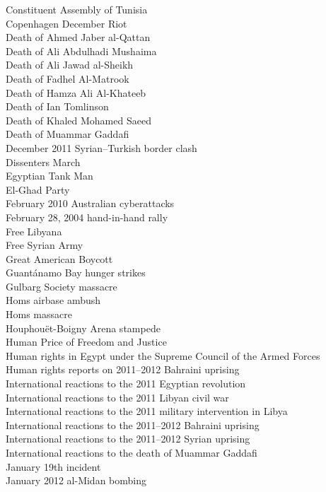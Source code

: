 Constituent Assembly of Tunisia\\
Copenhagen December Riot\\
Death of Ahmed Jaber al-Qattan\\
Death of Ali Abdulhadi Mushaima\\
Death of Ali Jawad al-Sheikh\\
Death of Fadhel Al-Matrook\\
Death of Hamza Ali Al-Khateeb\\
Death of Ian Tomlinson\\
Death of Khaled Mohamed Saeed\\
Death of Muammar Gaddafi\\
December 2011 Syrian–Turkish border clash\\
Dissenters March\\
Egyptian Tank Man\\
El-Ghad Party\\
February 2010 Australian cyberattacks\\
February 28, 2004 hand-in-hand rally\\
Free Libyana\\
Free Syrian Army\\
Great American Boycott\\
Guantánamo Bay hunger strikes\\
Gulbarg Society massacre\\
Homs airbase ambush\\
Homs massacre\\
Houphouët-Boigny Arena stampede\\
Human Price of Freedom and Justice\\
Human rights in Egypt under the Supreme Council of the Armed Forces\\
Human rights reports on 2011–2012 Bahraini uprising\\
International reactions to the 2011 Egyptian revolution\\
International reactions to the 2011 Libyan civil war\\
International reactions to the 2011 military intervention in Libya\\
International reactions to the 2011–2012 Bahraini uprising\\
International reactions to the 2011–2012 Syrian uprising\\
International reactions to the death of Muammar Gaddafi\\
January 19th incident\\
January 2012 al-Midan bombing\\
